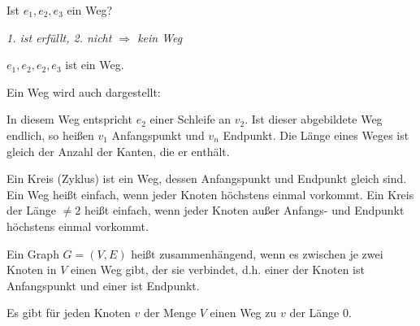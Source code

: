\begin{beispiel}
	\qquad
	\vspace{2mm}
	
	\begin{minipage}{4cm}
	\end{minipage}
	\begin{minipage}{10cm}
		Ist $e_1, e_2, e_3$ ein Weg?
		
		\emph{1. ist erfüllt, 2. nicht $\Rightarrow$ kein Weg}
		 
		 $e_1, e_2, e_2, e_3$ ist ein Weg.
	\end{minipage}
\end{beispiel}


\begin{definition}
	Ein Weg wird auch dargestellt:
	\vspace{2mm}
	
	\begin{center}
	\end{center}
	
	In diesem Weg entspricht $e_2$ einer Schleife an $v_2$. Ist dieser abgebildete Weg endlich, so heißen $v_1$ Anfangspunkt und $v_n$ Endpunkt. Die Länge eines Weges ist gleich der Anzahl der Kanten, die er enthält.
	
	Ein Kreis (Zyklus) ist ein Weg, dessen Anfangspunkt und Endpunkt gleich sind. Ein Weg heißt einfach, wenn jeder Knoten höchstens einmal vorkommt. Ein Kreis der Länge $\ne 2$ heißt einfach, wenn jeder Knoten außer Anfangs- und Endpunkt höchstens einmal vorkommt.
\end{definition}


\begin{definition}
	Ein Graph $G = (V, E)$ heißt zusammenhängend, wenn es zwischen je zwei Knoten in $V$ einen Weg gibt, der sie verbindet, d.h. einer der Knoten ist Anfangspunkt und einer ist Endpunkt. 
	
	Es gibt für jeden Knoten $v$ der Menge $V$ einen Weg zu $v$ der Länge $0$.
\end{definition}